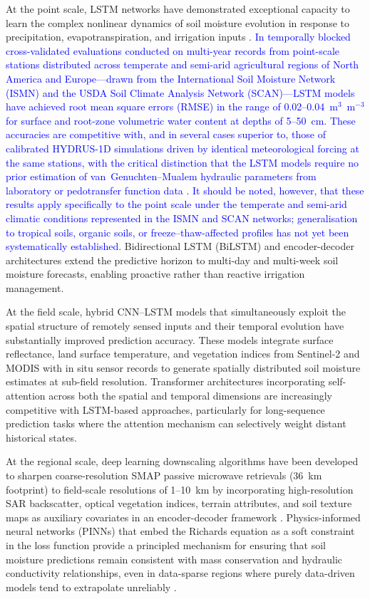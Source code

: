 \documentclass[land,article,submit,pdftex,moreauthors]{Definitions/mdpi}
\numberwithin{equation}{section}
\begin{document}
At the point scale, LSTM networks have demonstrated exceptional capacity to learn the complex nonlinear dynamics of soil moisture evolution in response to precipitation, evapotranspiration, and irrigation inputs \cite{Datta}. \textcolor{blue}{In temporally blocked cross-validated evaluations conducted on multi-year records from point-scale stations distributed across temperate and semi-arid agricultural regions of North America and Europe---drawn from the International Soil Moisture Network (ISMN) and the USDA Soil Climate Analysis Network (SCAN)---LSTM models have achieved root mean square errors (RMSE) in the range of 0.02--0.04~m$^3$~m$^{-3}$ for surface and root-zone volumetric water content at depths of 5--50~cm. These accuracies are competitive with, and in several cases superior to, those of calibrated HYDRUS-1D simulations driven by identical meteorological forcing at the same stations, with the critical distinction that the LSTM models require no prior estimation of van~Genuchten--Mualem hydraulic parameters from laboratory or pedotransfer function data \citep{kratzert2018rainfall}. It should be noted, however, that these results apply specifically to the point scale under the temperate and semi-arid climatic conditions represented in the ISMN and SCAN networks; generalisation to tropical soils, organic soils, or freeze--thaw-affected profiles has not yet been systematically established.} Bidirectional LSTM (BiLSTM) and encoder-decoder architectures extend the predictive horizon to multi-day and multi-week soil moisture forecasts, enabling proactive rather than reactive irrigation management.

At the field scale, hybrid CNN--LSTM models that simultaneously exploit the spatial structure of remotely sensed inputs and their temporal evolution have substantially improved prediction accuracy. These models integrate surface reflectance, land surface temperature, and vegetation indices from Sentinel-2 and MODIS with in situ sensor records to generate spatially distributed soil moisture estimates at sub-field resolution. Transformer architectures incorporating self-attention across both the spatial and temporal dimensions are increasingly competitive with LSTM-based approaches, particularly for long-sequence prediction tasks where the attention mechanism can selectively weight distant historical states.

At the regional scale, deep learning downscaling algorithms have been developed to sharpen coarse-resolution SMAP passive microwave retrievals (36~km footprint) to field-scale resolutions of 1--10~km by incorporating high-resolution SAR backscatter, optical vegetation indices, terrain attributes, and soil texture maps as auxiliary covariates in an encoder-decoder framework \citep{fang2019deep}. Physics-informed neural networks (PINNs) that embed the Richards equation as a soft constraint in the loss function provide a principled mechanism for ensuring that soil moisture predictions remain consistent with mass conservation and hydraulic conductivity relationships, even in data-sparse regions where purely data-driven models tend to extrapolate unreliably \citep{karniadakis2021physics}.
\end{document}
